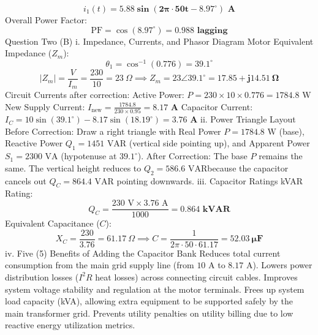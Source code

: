$$i_1(t) = \mathbf{5.88\sin(2\pi \cdot 50t - 8.97^\circ)\text{ A}}$$ 
Overall Power Factor:
$$\text{PF} = \cos(8.97^\circ) = \mathbf{0.988\text{ lagging}}$$ 
Question Two (B)
i. Impedance, Currents, and Phasor Diagram
Motor Equivalent Impedance ($Z_m$):
$$\theta_1 = \cos^{-1}(0.776) = 39.1^\circ$$ 
$$\vert{}Z_m\vert{} = \frac{V}{I_m} = \frac{230}{10} = 23\ \Omega \implies Z_m = 23\angle 39.1^\circ = \mathbf{17.85 + j14.51\ \Omega}$$ 
Circuit Currents after correction:
Active Power: $P = 230 \times 10 \times 0.776 = 1784.8\text{ W}$
New Supply Current: $I_{\text{new}} = \frac{1784.8}{230 \times 0.95} = \mathbf{8.17\text{ A}}$
Capacitor Current: $I_C = 10\sin(39.1^\circ) - 8.17\sin(18.19^\circ) = \mathbf{3.76\text{ A}}$
ii. Power Triangle Layout
Before Correction: Draw a right triangle with Real Power $P = 1784.8\text{ W}$ (base), Reactive Power $Q_1 = 1451\text{ VAR}$ (vertical side pointing up), and Apparent Power $S_1 = 2300\text{ VA}$ (hypotenuse at $39.1^\circ$).
After Correction: The base $P$ remains the same. The vertical height reduces to $Q_2 = 586.6\text{ VAR}$because the capacitor cancels out $Q_C = 864.4\text{ VAR}$ pointing downwards.
iii. Capacitor Ratings
kVAR Rating:
$$Q_C = \frac{230\text{ V} \times 3.76\text{ A}}{1000} = \mathbf{0.864\text{ kVAR}}$$ 
Equivalent Capacitance ($C$):
$$X_C = \frac{230}{3.76} = 61.17\ \Omega \implies C = \frac{1}{2\pi \cdot 50 \cdot 61.17} = \mathbf{52.03\ \mu\text{F}}$$ 
iv. Five (5) Benefits of Adding the Capacitor Bank
Reduces total current consumption from the main grid supply line (from $10\text{ A}$ to $8.17\text{ A}$).
Lowers power distribution losses ($I^2R$ heat losses) across connecting circuit cables.
Improves system voltage stability and regulation at the motor terminals.
Frees up system load capacity (kVA), allowing extra equipment to be supported safely by the main transformer grid.
Prevents utility penalties on utility billing due to low reactive energy utilization metrics.
